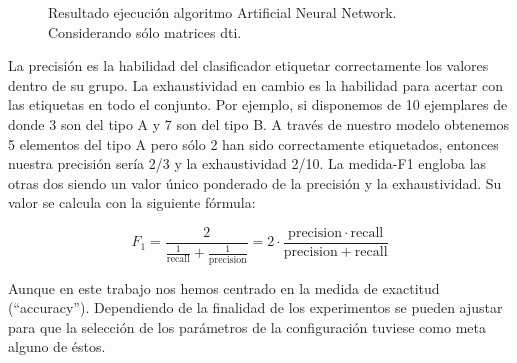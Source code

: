 \begin{figure}[H]
\centering
{}
\caption{Resultado ejecución algoritmo Artificial Neural Network. Considerando sólo matrices \gls{dti}.}
\label{figure:anndti}
\end{figure}

La precisión es la habilidad del clasificador etiquetar correctamente los valores dentro de su grupo. La exhaustividad en cambio es la habilidad para acertar con las etiquetas en todo el conjunto. Por ejemplo, si disponemos de 10 ejemplares de donde 3 son del tipo A y 7 son del tipo B. A través de nuestro modelo obtenemos 5 elementos del tipo A pero sólo 2 han sido correctamente etiquetados, entonces nuestra precisión sería 2/3 y la exhaustividad 2/10. La medida-F1 engloba las otras dos siendo un valor único ponderado de la precisión y la exhaustividad. Su valor se calcula con la siguiente fórmula: 

$$F_1 = \frac{2}{\tfrac{1}{\mathrm{recall}} + \tfrac{1}{\mathrm{precision}}} = 2 \cdot \frac{\mathrm{precision} \cdot \mathrm{recall}}{\mathrm{precision} + \mathrm{recall}}$$

Aunque en este trabajo nos hemos centrado en la medida de exactitud (``accuracy''). Dependiendo de la finalidad de los experimentos se pueden ajustar para que la selección de los parámetros de la configuración tuviese como meta alguno de éstos.
